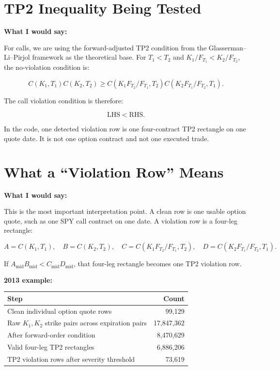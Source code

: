 \documentclass[11pt]{article}
\begin{document}
\section*{TP2 Inequality Being Tested}

\textbf{What I would say:}

For calls, we are using the forward-adjusted TP2 condition from the
Glasserman--Li--Pirjol framework as the theoretical base. For $T_1<T_2$ and
$K_1/F_{T_1}<K_2/F_{T_2}$, the no-violation condition is:

\[
C(K_1,T_1)C(K_2,T_2)
\geq
C(K_1F_{T_2}/F_{T_1},T_2)C(K_2F_{T_1}/F_{T_2},T_1).
\]

The call violation condition is therefore:

\[
\mathrm{LHS}<\mathrm{RHS}.
\]

In the code, one detected violation row is one four-contract TP2 rectangle on
one quote date. It is not one option contract and not one executed trade.

\section*{What a ``Violation Row'' Means}

\textbf{What I would say:}

This is the most important interpretation point. A clean row is one usable
option quote, such as one SPY call contract on one date. A violation row is a
four-leg rectangle:

\[
A=C(K_1,T_1), \quad B=C(K_2,T_2), \quad
C=C(K_1F_{T_2}/F_{T_1},T_2), \quad
D=C(K_2F_{T_1}/F_{T_2},T_1).
\]

If $A_{\mathrm{mid}}B_{\mathrm{mid}} < C_{\mathrm{mid}}D_{\mathrm{mid}}$, that
four-leg rectangle becomes one TP2 violation row.

\textbf{2013 example:}

\begin{center}
\begin{tabular}{lr}
\toprule
Step & Count \\
\midrule
Clean individual option quote rows & 99,129 \\
Raw $K_1,K_2$ strike pairs across expiration pairs & 17,847,362 \\
After forward-order condition & 8,470,629 \\
Valid four-leg TP2 rectangles & 6,886,206 \\
TP2 violation rows after severity threshold & 73,619 \\
\bottomrule
\end{tabular}
\end{center}
\end{document}
